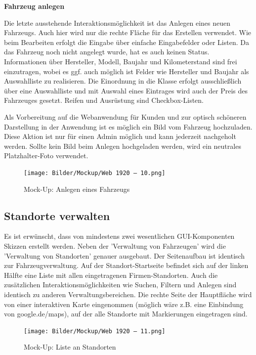 \newpage

\textbf{Fahrzeug anlegen}

Die letzte ausstehende Interaktionsmöglichkeit ist das Anlegen eines neuen Fahrzeugs. Auch hier wird nur die rechte Fläche für das Erstellen verwendet. Wie beim Bearbeiten erfolgt die Eingabe über einfache Eingabefelder oder Listen. Da das Fahrzeug noch nicht angelegt wurde, hat es auch keinen Status. Informationen über Hersteller, Modell, Baujahr und Kilometerstand sind frei einzutragen, wobei es ggf. auch möglich ist Felder wie Hersteller und Baujahr als Auswahlliste zu realisieren. Die Einordnung in die Klasse erfolgt ausschließlich über eine Auswahlliste und mit Auswahl eines Eintrages wird auch der Preis des Fahrzeuges gesetzt. Reifen und Ausrüstung sind Checkbox-Listen. 

Als Vorbereitung auf die Webanwendung für Kunden und zur optisch schöneren Darstellung in der Anwendung ist es möglich ein Bild vom Fahrzeug hochzuladen. Diese Aktion ist nur für einen Admin möglich und kann jederzeit nachgeholt werden. Sollte kein Bild beim Anlegen hochgeladen werden, wird ein neutrales Platzhalter-Foto verwendet. 

\begin{figure}[!ht]
    \centering
    \texttt{[image: Bilder/Mockup/Web 1920 – 10.png]}
    \caption{Mock-Up: Anlegen eines Fahrzeugs}
    \label{mu:anlegen}
\end{figure}

\subsection{Standorte verwalten}

Es ist erwünscht, dass von mindestens zwei wesentlichen GUI-Komponenten Skizzen erstellt werden. Neben der 'Verwaltung von Fahrzeugen' wird die 'Verwaltung von Standorten' genauer ausgebaut. Der Seitenaufbau ist identisch zur Fahrzeugverwaltung. Auf der Standort-Startseite befindet sich auf der linken Hälfte eine Liste mit allen eingetragenen Firmen-Standorten. Auch die zusätzlichen Interaktionsmöglichkeiten wie Suchen, Filtern und Anlegen sind identisch zu anderen Verwaltungsbereichen. Die rechte Seite der Hauptfläche wird von einer interaktiven Karte eingenommen (möglich wäre z.B. eine Einbindung von google.de/maps), auf der alle Standorte mit Markierungen eingetragen sind. 

\begin{figure}[!ht]
    \centering
    \texttt{[image: Bilder/Mockup/Web 1920 – 11.png]}
    \caption{Mock-Up: Liste an Standorten}
    \label{mu:standortliste}
\end{figure}


